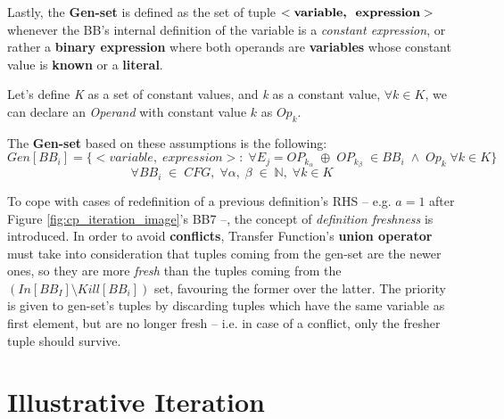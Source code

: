 \documentclass[a4paper,12pt,numbers=noenddot]{scrreprt}
\begin{document}
        Lastly, the \textbf{Gen-set} is defined as the set of tuple $<\textbf{variable,\; expression}>$ whenever the BB's internal definition of the variable is a \textit{constant expression}, or rather a \textbf{binary expression} where both operands are \textbf{variables} whose constant value is \textbf{known} or a \textbf{literal}.

        Let's define \textit{K} as a set of constant values, and \textit{k} as a constant value, $\forall k \in K$, we can declare an \textit{Operand} with constant value $k$ as \textit{$Op_k$}.
        
        The \textbf{Gen-set} based on these assumptions is the following: $$Gen[BB_i] = \{ <variable,\; expression > : \; \forall E_j = OP_{k_\alpha} \; \oplus \; OP_{k_\beta} \; \in BB_i\; \wedge \; Op_k \; \forall k \in K \}$$
        $$\forall BB_i \; \in \; CFG, \; \forall \alpha, \; \beta \; \in \; \mathbb{N}, \; \forall k \in K$$

        To cope with cases of redefinition of a previous definition's RHS -- e.g. $a=1$ after Figure \ref{fig:cp_iteration_image}'s BB7 --, the concept of \textit{definition freshness} is introduced. In order to avoid \textbf{conflicts}, Transfer Function's \textbf{union operator} must take into consideration that tuples coming from the gen-set are the newer ones, so they are more \textit{fresh} than the tuples coming from the $(In[BB_I] \setminus Kill[BB_i])$ set, favouring the former over the latter. The priority is given to gen-set's tuples by discarding tuples which have the same variable as first element, but are no longer fresh -- i.e. in case of a conflict, only the fresher tuple should survive.
        
    \section*{Illustrative Iteration}
\end{document}
